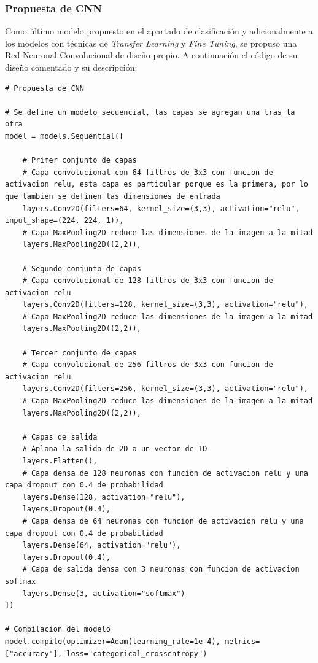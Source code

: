 \subsubsection{Propuesta de CNN}

Como último modelo propuesto en el apartado de clasificación y adicionalmente a los modelos con técnicas de \textit{Transfer Learning} y \textit{Fine Tuning}, se propuso una Red Neuronal Convolucional de diseño propio. A continuación el código de su diseño comentado y su descripción: 

\begin{lstlisting}[caption={Código diseño propio de CNN}]
# Propuesta de CNN

# Se define un modelo secuencial, las capas se agregan una tras la otra
model = models.Sequential([
    
    # Primer conjunto de capas
    # Capa convolucional con 64 filtros de 3x3 con funcion de activacion relu, esta capa es particular porque es la primera, por lo que tambien se definen las dimensiones de entrada
    layers.Conv2D(filters=64, kernel_size=(3,3), activation="relu", input_shape=(224, 224, 1)),
    # Capa MaxPooling2D reduce las dimensiones de la imagen a la mitad
    layers.MaxPooling2D((2,2)),
    
    # Segundo conjunto de capas
    # Capa convolucional de 128 filtros de 3x3 con funcion de activacion relu
    layers.Conv2D(filters=128, kernel_size=(3,3), activation="relu"),
    # Capa MaxPooling2D reduce las dimensiones de la imagen a la mitad
    layers.MaxPooling2D((2,2)),
    
    # Tercer conjunto de capas
    # Capa convolucional de 256 filtros de 3x3 con funcion de activacion relu
    layers.Conv2D(filters=256, kernel_size=(3,3), activation="relu"),
    # Capa MaxPooling2D reduce las dimensiones de la imagen a la mitad
    layers.MaxPooling2D((2,2)),
    
    # Capas de salida
    # Aplana la salida de 2D a un vector de 1D
    layers.Flatten(),
    # Capa densa de 128 neuronas con funcion de activacion relu y una capa dropout con 0.4 de probabilidad
    layers.Dense(128, activation="relu"),
    layers.Dropout(0.4),
    # Capa densa de 64 neuronas con funcion de activacion relu y una capa dropout con 0.4 de probabilidad
    layers.Dense(64, activation="relu"),
    layers.Dropout(0.4),
    # Capa de salida densa con 3 neuronas con funcion de activacion softmax
    layers.Dense(3, activation="softmax")
])

# Compilacion del modelo
model.compile(optimizer=Adam(learning_rate=1e-4), metrics=["accuracy"], loss="categorical_crossentropy")
\end{lstlisting}

